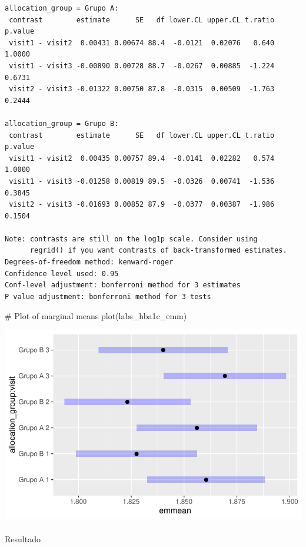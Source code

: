 \documentclass[
  12pt,
]{article}
\makeatletter
\let\oldparagraph\paragraph
\renewcommand{\paragraph}{
    \@ifstar
      \xxxParagraphStar
      \xxxParagraphNoStar
  }
\newcommand{\xxxParagraphStar}[1]{\oldparagraph*{#1}\mbox{}}
\newcommand{\xxxParagraphNoStar}[1]{\oldparagraph{#1}\mbox{}}
\newenvironment{Shaded}{\begin{snugshade}}{\end{snugshade}}
\newcommand{\CommentTok}[1]{\textcolor[rgb]{0.37,0.37,0.37}{#1}}
\newcommand{\FunctionTok}[1]{\textcolor[rgb]{0.28,0.35,0.67}{#1}}
\newcommand{\NormalTok}[1]{\textcolor[rgb]{0.00,0.23,0.31}{#1}}
\makeatother
\begin{document}
\begin{verbatim}
allocation_group = Grupo A:
 contrast        estimate      SE   df lower.CL upper.CL t.ratio p.value
 visit1 - visit2  0.00431 0.00674 88.4  -0.0121  0.02076   0.640  1.0000
 visit1 - visit3 -0.00890 0.00728 88.7  -0.0267  0.00885  -1.224  0.6731
 visit2 - visit3 -0.01322 0.00750 87.8  -0.0315  0.00509  -1.763  0.2444

allocation_group = Grupo B:
 contrast        estimate      SE   df lower.CL upper.CL t.ratio p.value
 visit1 - visit2  0.00435 0.00757 89.4  -0.0141  0.02282   0.574  1.0000
 visit1 - visit3 -0.01258 0.00819 89.5  -0.0326  0.00741  -1.536  0.3845
 visit2 - visit3 -0.01693 0.00852 87.9  -0.0377  0.00387  -1.986  0.1504

Note: contrasts are still on the log1p scale. Consider using
      regrid() if you want contrasts of back-transformed estimates. 
Degrees-of-freedom method: kenward-roger 
Confidence level used: 0.95 
Conf-level adjustment: bonferroni method for 3 estimates 
P value adjustment: bonferroni method for 3 tests 
\end{verbatim}

\begin{Shaded}
\begin{Highlighting}[]
\CommentTok{\# Plot of marginal means}
\FunctionTok{plot}\NormalTok{(labs\_hba1c\_emm)}
\end{Highlighting}
\end{Shaded}

\includegraphics{Outcomes_files/figure-pdf/labs_hba1c_sens_emm-1.pdf}

\paragraph{Resultado}\label{resultado-9}
\end{document}
